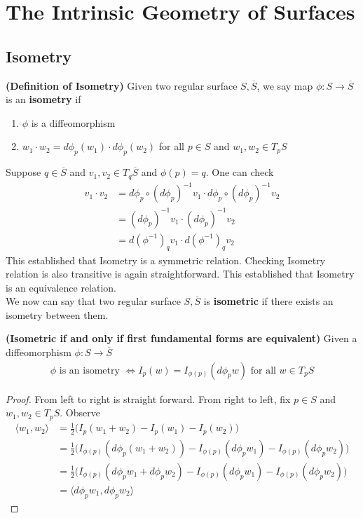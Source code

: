 \documentclass{report}
\begin{document}
\chapter{The Intrinsic Geometry of Surfaces}
\section{Isometry}
\begin{definition}
\textbf{(Definition of Isometry)} Given two regular surface $S,\overline{S}$, we say map $\phi:S\rightarrow \overline{S}$ is an \textbf{isometry} if 
\begin{enumerate}[label=(\alph*)]
  \item $\phi$ is a diffeomorphism 
  \item $w_1\cdot w_2= d\phi_p (w_1)\cdot d\phi_p (w_2) $ for all $p \in S$ and $w_1,w_2 \in T_pS$
\end{enumerate}
\end{definition}
\begin{mdframed}
Suppose $q \in \overline{S}$ and $v_1,v_2 \in T_q \overline{S}$ and $\phi (p)=q$. One can check 
\begin{align*}
v_1\cdot v_2 &=  d\phi_p \circ (d\phi_p)^{-1} v_1\cdot d\phi_p \circ (d\phi_p)^{-1} v_2\\
&=(d\phi_p)^{-1}v_1 \cdot (d\phi_p)^{-1}v_2\\
&=d(\phi^{-1})_qv_1 \cdot d(\phi^{-1})_q v_2
\end{align*}
This established that Isometry is a symmetric relation. Checking Isometry relation is also transitive is again straightforward. This established that Isometry is an equivalence relation.\\

We now can say that two regular surface $S,\overline{S}$ is \textbf{isometric} if there exists an isometry between them.
\end{mdframed}
\begin{theorem}
\textbf{(Isometric if and only if first fundamental forms are equivalent)} Given a diffeomorphism $\phi:S\rightarrow \overline{S}$ 
\begin{align*}
\phi\text{ is an isometry }\iff I_p(w)=I_{\phi (p)}(d\phi_p w)\text{ for all }w \in T_pS
\end{align*}
\end{theorem}
\begin{proof}
From left to right is straight forward. From right to left, fix $p \in S$ and $w_1,w_2 \in T_pS$. Observe 
\begin{align*}
\langle w_1,w_2\rangle &= \frac{1}{2}\Big(I_p(w_1+w_2)-I_p(w_1)-I_p(w_2) \Big)\\
&=\frac{1}{2}\Big(I_{\phi(p)} (d\phi_p (w_1+w_2))- I_{\phi(p)}(d\phi_p w_1)-I_{\phi(p)}(d\phi_p w_2)\Big)\\
&=\frac{1}{2}\Big(I_{\phi(p)} (d\phi_p w_1+d\phi_p w_2)- I_{\phi(p)}(d\phi_p w_1)-I_{\phi(p)}(d\phi_p w_2)\Big)\\
&=\langle d\phi_p w_1, d\phi_p w_2\rangle 
\end{align*}
\end{proof}
\end{document}
